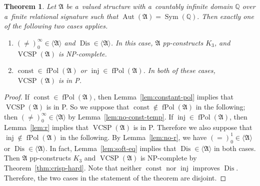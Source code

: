 \documentclass[preprint,12pt]{elsarticle}
\newcommand{\Q}{\mathbb Q}
\newcommand{\bA}{{\mathfrak A}}
\newcommand{\checked}[1]{#1}
\DeclareMathOperator{\Aut}{Aut}
\DeclareMathOperator{\fPol}{fPol}
\DeclareMathOperator{\VCSP}{VCSP}
\DeclareMathOperator{\vcsp}{VCSP}
\DeclareMathOperator{\Sym}{Sym}
\DeclareMathOperator{\inj}{inj}
\DeclareMathOperator{\const}{const}
\DeclareMathOperator{\Dis}{Dis}
\newtheorem{theorem}{Theorem}
\begin{document}
\begin{theorem}\label{thm:eqvcsp}
Let $\bA$ be a~valued structure 
with a~countably infinite domain $\Q$ over a~finite relational signature such that $\Aut(\bA) = \Sym(\Q).$
Then exactly one of the following two cases applies. 
\begin{enumerate}
    \item $(\neq)_0^\infty \in \langle \bA \rangle$ 
    and $\Dis \in \langle \bA \rangle$. In this case, 
$\bA$ pp-constructs $K_3$, and $\vcsp(\bA)$ is NP-complete. 
\item $\const\in \fPol(\bA)$ or $\inj\in \fPol(\bA)$.
In both of these cases, $\vcsp(\bA)$ is in P. 
\end{enumerate}
\end{theorem}

\begin{proof}
If $\const\in \fPol(\bA)$, then  Lemma~\ref{lem:constant-pol} implies that $\vcsp(\checked{\bA})$ is in P. So we suppose that $\const \notin \fPol(\bA)$ in the following; then $(\neq)_0^{\infty} \in \langle \bA \rangle$ by Lemma~\ref{lem:no-const-temp}.
If $\inj \in \fPol(\bA)$, then Lemma~\ref{lem:r} implies that $\vcsp(\bA)$ is in P. Therefore we also suppose that 
$\inj \notin \fPol(\bA)$ in the following. By Lemma~\ref{lem:no-r}, we have $(=)_0^1\in \langle \bA \rangle$ or  $\Dis \in \langle \bA \rangle$. In fact, Lemma~\ref{lem:soft-eq} implies that $\Dis \in \langle \bA \rangle$ in both cases. Then $\bA$ pp-constructs $K_3$ and $\VCSP(\bA)$ is NP-complete by Theorem~\ref{thm:crisp-hard}.
Note that neither $\const$ nor $\inj$ improves $\Dis$.
Therefore, the two cases in the statement of the theorem are disjoint.
\end{proof}


\end{document}
